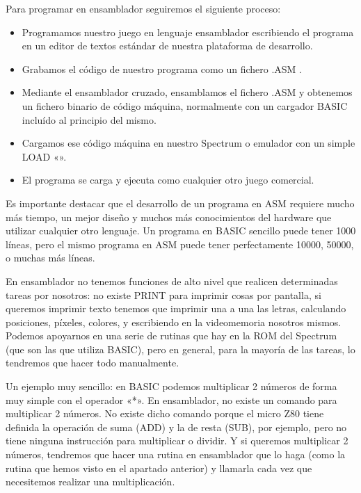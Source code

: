 \documentclass[letterpaper,10pt,spanish]{sphinxmanual}
\begin{document}
Para programar en ensamblador seguiremos el siguiente proceso:
\begin{itemize}
\item {} 
Programamos nuestro juego en lenguaje ensamblador escribiendo el programa en un editor de textos estándar de nuestra plataforma de desarrollo.

\item {} 
Grabamos el código de nuestro programa como un fichero .ASM .

\item {} 
Mediante el ensamblador cruzado, ensamblamos el fichero .ASM y obtenemos un fichero binario de código máquina, normalmente con un cargador BASIC incluído al principio del mismo.

\item {} 
Cargamos ese código máquina en nuestro Spectrum o emulador con un simple LOAD «».

\item {} 
El programa se carga y ejecuta como cualquier otro juego comercial.

\end{itemize}

Es importante destacar que el desarrollo de un programa en ASM requiere mucho más tiempo, un mejor diseño y muchos más conocimientos del hardware que utilizar cualquier otro lenguaje. Un programa en BASIC sencillo puede tener 1000 líneas, pero el mismo programa en ASM puede tener perfectamente 10000, 50000, o muchas más líneas.

En ensamblador no tenemos funciones de alto nivel que realicen determinadas tareas por nosotros: no existe PRINT para imprimir cosas por pantalla, si queremos imprimir texto tenemos que imprimir una a una las letras, calculando posiciones, píxeles, colores, y escribiendo en la videomemoria nosotros mismos. Podemos apoyarnos en una serie de rutinas que hay en la ROM del Spectrum (que son las que utiliza BASIC), pero en general, para la mayoría de las tareas, lo tendremos que hacer todo manualmente.

Un ejemplo muy sencillo: en BASIC podemos multiplicar 2 números de forma muy simple con el operador «*». En ensamblador, no existe un comando para multiplicar 2 números. No existe dicho comando porque el micro Z80 tiene definida la operación de suma (ADD) y la de resta (SUB), por ejemplo, pero no tiene ninguna instrucción para multiplicar o dividir. Y si queremos multiplicar 2 números, tendremos que hacer una rutina en ensamblador que lo haga (como la rutina que hemos visto en el apartado anterior) y llamarla cada vez que necesitemos realizar una multiplicación.
\end{document}
